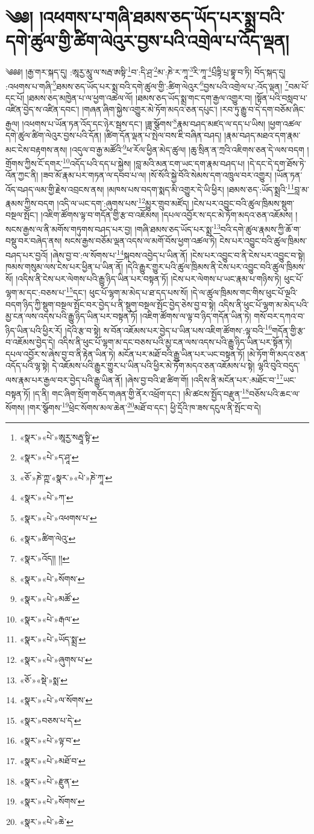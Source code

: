 \chapter{༄༅། །འཕགས་པ་གཞི་ཐམས་ཅད་ཡོད་པར་སྨྲ་བའི་དགེ་ཚུལ་གྱི་ཚིག་ལེའུར་བྱས་པའི་འགྲེལ་པ་འོད་ལྡན།}༄༅༅། །རྒྱ་གར་སྐད་དུ། :ཨཱརྱ་མཱུ་ལ་སརྦ་ཨསྟི་\footnote{«སྣར་»«པེ་»ཨཱརྱ་སརྦཱ་སྟི་}བ་:དི་ཤྲ་\footnote{«སྣར་»«པེ་»ད་ཤཱ་}མ་:ཎེ་ར་ཀཱ་\footnote{«ཅོ་»ཎེ་ཀྵ་«སྣར་»«པེ་»ཎེ་ཀཱ་}རི་ཀཱ་\footnote{«སྣར་»«པེ་»ཀ་}པྲྀཏྟི་པྲ་བྷཱ་བ་ཏི། བོད་སྐད་དུ། :འཕགས་པ་གཞི་\footnote{«སྣར་»«པེ་»འཕགས་པ་}ཐམས་ཅད་ཡོད་པར་སྨྲ་བའི་དགེ་ཚུལ་གྱི་:ཚིག་ལེའུར་\footnote{«སྣར་»ཚིག་ལེའུ་}བྱས་པའི་འགྲེལ་པ་:འོད་ལྡན། \footnote{«སྣར་»འོད།། །།}བམ་པོ་དང་པོ། །ཐམས་ཅད་མཁྱེན་པ་ལ་ཕྱག་འཚལ་ལོ། །ཐམས་ཅད་ཡོད་སྨྲ་གང་དག་རྒྱལ་འགྱུར་བ། །སྟོན་པའི་བསླབ་པ་འཛིན་བྱེད་ས་འཛིན་དབང་། །གཞན་ཞིག་སྐྱེས་འགྱུར་མེ་ཏོག་མདའ་ཅན་དཔུང་། །རབ་ཏུ་རྒྱུ་བ་དེ་དག་བཅོམ་ཞིང་རྒྱལ། །འཕགས་པ་ཡོན་ཏན་འོད་དང་ཉེར་སྦས་དང་། །ཟླ་སྩོགས་\footnote{«སྣར་»«པེ་»སོགས་}རྣམ་བཤད་མཛད་ལ་དད་པ་ཡིས། །ཕྱག་འཚལ་དགེ་ཚུལ་ཚིག་ལེའུར་བྱས་པའི་དོན། །ཚིག་དོན་ལྡན་པ་སྤེལ་བས་ཇི་བཞིན་བཤད། །རྣམ་བཤད་མཐའ་དག་རྣམ་མང་ངེས་བརྟགས་ནས། །འདུལ་བ་རྒྱ་མཚོའི་\footnote{«སྣར་»«པེ་»མཚོ་}ཕ་རོལ་ཕྱིན་མེད་ཚུལ། །ཆུ་སྲིན་ན་ཀྲའི་འཇིགས་ཅན་དེ་ལས་བདག །གྲོགས་ཀྱིས་ངོ་དགར་\footnote{«སྣར་»«པེ་»རྒལ་}འདོད་པའི་དད་པ་སྐྱེས། །བླ་མའི་མན་ངག་ཡང་དག་རྣམ་བཤད་པ། །དེ་དང་དེ་དག་ཐོས་ཏེ་འོན་ཀྱང་ནི། །ཟབ་མོ་རྣམ་པར་གཏན་ལ་དབབ་པ་ལ། །སོ་སོའི་སྐྱེ་བོའི་སེམས་དག་འཁྲུལ་བར་འགྱུར། །ཡོན་ཏན་འོད་བཤད་ལམ་གྱི་རྗེས་འབྲངས་ནས། །མཁས་པས་བདག་སྨད་མི་འགྱུར་དེ་ཡི་ཕྱིར། །ཐམས་ཅད་:ཡོད་སྨྲའི་\footnote{«སྣར་»«པེ་»ཡོད་སྨྲ་}བླ་མ་རྣམས་ཀྱིས་བདག །འདི་ལ་ཡང་དག་:ཞུགས་པས་\footnote{«སྣར་»«པེ་»ཞུགས་པ་}མྱུར་གྲུབ་མཛོད། །ངེས་པར་འབྱུང་བའི་ཚུལ་ཁྲིམས་སྡུག་བསྔལ་སྤོང་། །འཇིག་ཚོགས་ལྟ་བ་གདོན་གྱི་རྩ་བ་འཇོམས། །དཔལ་འབྱོར་ས་དང་མེ་ཏོག་མདའ་ཅན་འཇོམས། །སངས་རྒྱས་ལ་ནི་མགོས་གཏུགས་བཤད་པར་བྱ། །གཞི་ཐམས་ཅད་ཡོད་པར་སྨྲ་\footnote{«ཅོ་»«སྡེ་»སྨ་}བའི་དགེ་ཚུལ་རྣམས་ཀྱི་ཆོ་ག་བསྡུ་བར་བཞེད་ནས། སངས་རྒྱས་བཅོམ་ལྡན་འདས་ལ་མགོ་བོས་ཕྱག་འཚལ་ཏེ། ངེས་པར་འབྱུང་བའི་ཚུལ་ཁྲིམས་བཤད་པར་བྱའོ། །ཞེས་བྱ་བ་:ལ་སོགས་པ་\footnote{«སྣར་»«པེ་»ལ་སོགས་}སྐབས་འབྱེད་པ་ཡིན་ནོ། །ངེས་པར་འབྱུང་བ་ནི་ངེས་པར་འབྱུང་བ་སྟེ། ཁམས་གསུམ་ལས་ངེས་པར་ཕྱིན་པ་ཡིན་ནོ། །དེའི་རྒྱུར་གྱུར་པའི་ཚུལ་ཁྲིམས་ནི་ངེས་པར་འབྱུང་བའི་ཚུལ་ཁྲིམས་སོ། །འདིས་ནི་ངེས་པར་ལེགས་པའི་རྒྱུ་ཉིད་ཡིན་པར་བསྟན་ཏོ། །ངེས་པར་ལེགས་པ་ཡང་རྣམ་པ་གཉིས་ཏེ། ཕུང་པོ་ལྷག་མ་དང་:བཅས་པ་\footnote{«སྣར་»བཅས་པ་དེ་}དང་། ཕུང་པོ་ལྷག་མ་མེད་པ་ཐ་དད་པས་སོ། །དེ་ལ་ཚུལ་ཁྲིམས་གང་གིས་ཕུང་པོ་ལྔའི་བདག་ཉིད་ཀྱི་སྡུག་བསྔལ་སྤོང་བར་བྱེད་པ་ནི་སྡུག་བསྔལ་སྤོང་བྱེད་ཅེས་བྱ་བ་སྟེ། འདིས་ནི་ཕུང་པོ་ལྷག་མ་མེད་པའི་མྱ་ངན་ལས་འདས་པའི་རྒྱུ་ཉིད་ཡིན་པར་བསྟན་ཏོ། །འཇིག་ཚོགས་ལ་ལྟ་བ་ཉིད་གདོན་ཡིན་ཏེ། གསོ་བར་དཀའ་བ་ཉིད་ཡིན་པའི་ཕྱིར་རོ། །དེའི་རྩ་བ་སྟེ། ས་བོན་འཇོམས་པར་བྱེད་པ་ཡིན་པས་འཇིག་ཚོགས་:ལྟ་བའི་\footnote{«སྣར་»«པེ་»ལྟ་བ་}གདོན་གྱི་རྩ་བ་འཇོམས་བྱེད་དེ། འདིས་ནི་ཕུང་པོ་ལྷག་མ་དང་བཅས་པའི་མྱ་ངན་ལས་འདས་པའི་རྒྱུ་ཉིད་ཡིན་པར་སྟོན་ཏེ། དཔལ་འབྱོར་ས་ཞེས་བྱ་བ་ནི་རྟེན་ཡིན་ཏེ། མངོན་པར་མཐོ་བའི་རྒྱུ་ཡིན་པར་ཡང་བསྟན་ཏོ། །མེ་ཏོག་གི་མདའ་ཅན་འདོད་པའི་ལྷ་སྟེ། དེ་འཇོམས་པའི་རྒྱུར་གྱུར་པ་ཡིན་པའི་ཕྱིར་མེ་ཏོག་མདའ་ཅན་འཇོམས་པ་སྟེ། ལྷའི་བུའི་བདུད་ལས་རྣམ་པར་རྒྱལ་བར་བྱེད་པའི་རྒྱུ་ཡིན་ནོ། །ཞེས་བྱ་བའི་ཐ་ཚིག་གོ། །འདིས་ནི་མངོན་པར་:མཐོང་བ་\footnote{«སྣར་»«པེ་»མཐོ་བ་}ཡང་བསྟན་ཏོ། །ད་ནི། གང་ཞིག་སྲོག་གཅོད་གཞན་གྱི་ནོར་འཕྲོག་དང་། །མི་ཚངས་སྤྱོད་བརྫུན་\footnote{«སྣར་»«པེ་»རྫུན་}བཅོས་པའི་ཆང་ལ་སོགས། །གར་སྩོགས་\footnote{«སྣར་»«པེ་»སོགས་}ཕྲེང་སོགས་མལ་ཆེན་\footnote{«སྣར་»«པེ་»ཆེ་}མཐོ་བ་དང་། ཕྱི་དྲོའི་ཁ་ཟས་དངུལ་ནི་སྤོང་བ་དེ། 